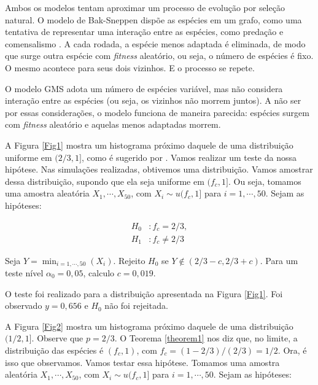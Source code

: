 \documentclass[10pt,brazil,english]{article}
\begin{document}
        Ambos os modelos tentam aproximar um processo de evolução por seleção natural.
        O modelo de Bak-Sneppen dispõe as espécies em um grafo, como uma tentativa de representar uma interação entre as espécies, como predação e comensalismo \cite{khouri2013estudos}.
        A cada rodada, a espécie menos adaptada é eliminada, de modo que surge outra espécie com \textit{fitness} aleatório, ou seja, o número de espécies é fixo.
        O mesmo acontece para seus dois vizinhos.
        E o processo se repete.

        O modelo GMS adota um número de espécies variável, mas não considera interação entre as espécies (ou seja, os vizinhos não morrem juntos).
        A não ser por essas considerações, o modelo funciona de maneira parecida: espécies surgem com \textit{fitness} aleatório e aquelas menos adaptadas morrem.

        A Figura \ref{Fig1} mostra um histograma próximo daquele de uma distribuição uniforme em $(2/3, 1]$, como é sugerido por .
        Vamos realizar um teste da nossa hipótese.
        Nas simulações realizadas, obtivemos uma distribuição.
        Vamos amostrar dessa distribuição, supondo que ela seja uniforme em $(f_c, 1]$.
        Ou seja, tomamos uma amostra aleatória $X_1, \cdots, X_{50}$, com $X_i \sim u(f_c, 1]$ para $i = 1, \cdots, 50$.
        Sejam as hipóteses:

        \begin{equation}
            \label{eq1}
            \begin{aligned}
                H_0&: f_c = 2/3, \\
                H_1&: f_c \neq 2/3
            \end{aligned}
        \end{equation}

        Seja $Y = \min_{i = 1, \cdots, 50}(X_i)$. Rejeito $H_0$ se $Y \notin (2/3 - c, 2/3 + c)$.
        Para um teste nível $\alpha_0 = 0,05$, calculo $c = 0,019$.

        O teste foi realizado para a distribuição apresentada na Figura \ref{Fig1}.
        Foi observado $y = 0,656$ e $H_0$ não foi rejeitada.

        A Figura \ref{Fig2} mostra um histograma próximo daquele de uma distribuição $(1/2, 1]$. Observe que $p = 2/3$.
        O Teorema \ref{theorem1} nos diz que, no limite, a distribuição das espécies é $(f_c, 1)$, com $f_c = (1 - 2/3)/(2/3) = 1/2$.
        Ora, é isso que observamos. Vamos testar essa hipótese.
        Tomamos uma amostra aleatória $X_1, \cdots, X_{50}$, com $X_i \sim u(f_c, 1]$ para $i = 1, \cdots, 50$.
        Sejam as hipóteses:
\end{document}
